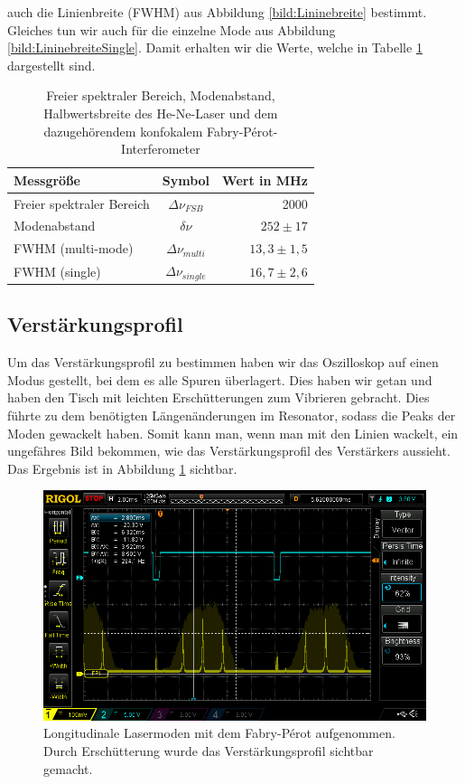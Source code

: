 auch die Linienbreite (FWHM) aus Abbildung \ref{bild:Lininebreite} bestimmt. Gleiches tun wir auch für die einzelne Mode
aus Abbildung \ref{bild:LininebreiteSingle}. Damit erhalten wir die Werte, welche in Tabelle \ref{tab:Linienbreite} dargestellt sind.

\begin{table}
    \centering
 
    \begin{tabular}{lcr}
        \toprule
        Messgröße & Symbol & Wert in MHz\\
        \midrule
        Freier spektraler Bereich& $\Delta \nu_{FSB}$ & 2000\\
        Modenabstand& $\delta\nu$& $252 \pm 17$\\
        FWHM (multi-mode)& $\Delta\nu_{multi}$&$13,3 \pm 1,5$\\
        FWHM (single)& $\Delta\nu_{single}$&$16,7 \pm 2,6$\\
        \bottomrule        
    \end{tabular}
  
    \caption{Freier spektraler Bereich, Modenabstand, Halbwertsbreite des He-Ne-Laser und dem dazugehörendem 
    konfokalem Fabry-Pérot-Interferometer}
    \label{tab:Linienbreite}
\end{table}


\subsection*{Verstärkungsprofil}

Um das Verstärkungsprofil zu bestimmen haben wir das Oszilloskop auf einen Modus gestellt, bei dem es alle Spuren 
überlagert. Dies haben wir getan und haben den Tisch mit leichten Erschütterungen zum Vibrieren gebracht.
Dies führte zu dem benötigten Längenänderungen im Resonator, sodass die Peaks der Moden gewackelt haben.
Somit kann man, wenn man mit den Linien wackelt, ein ungefähres Bild bekommen, wie das Verstärkungsprofil
des Verstärkers aussieht. Das Ergebnis ist in Abbildung \ref{bild:Verstaerkung} sichtbar.

\begin{figure}[h]
    \centering
    \includegraphics[width = \linewidth]{Bilder/Auswertung/FabryPerotVerst.png}
    \caption{Longitudinale Lasermoden mit dem Fabry-Pérot aufgenommen. Durch Erschütterung wurde das Verstärkungsprofil sichtbar gemacht.}
    \label{bild:Verstaerkung}
\end{figure}

